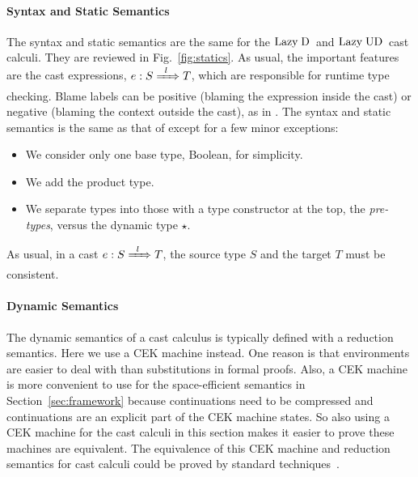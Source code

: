 \documentclass[runningheads]{llncs}
\newcommand{\figref}[1]{Fig.~\ref{#1}}
\newcommand{\chapref}[1]{Section~\ref{#1}}
\newcommand{\LUD}{\ensuremath{\text{Lazy\;UD}}}
\newcommand{\LD}{\ensuremath{\text{Lazy\;D}}}
\newcommand{\Tdyn}[0]{\ensuremath{\star}}
\newcommand{\ecast}[2]{\ensuremath{#1 : #2}}
\newcommand{\ccast}[3]{#1 \xRightarrow[]{\enskip #2 \enskip} #3}
\begin{document}
\paragraph{Syntax and Static Semantics}


The syntax and static semantics are the same for the \LD\ and
\LUD\ cast calculi. They are reviewed in \figref{fig:statics}.
As usual, the important features are the cast expressions,
$\ecast{e}{\ccast{S}{l}{T}}$, which are responsible for runtime type
checking. Blame labels can be positive (blaming the expression inside the cast)
or negative (blaming the context outside the cast), as in \cite{wadler2009well}.
The syntax and static semantics is the same as that of 
\citep{siek2009exploring} except for a few minor exceptions:

\begin{itemize}
\item We consider only one base type, Boolean, for simplicity.
\item We add the product type.
\item We separate types into those with a type constructor at the top,
  the \emph{pre-types}, versus the dynamic type \Tdyn.
\end{itemize}
As usual, in a cast $\ecast{e}{\ccast{S}{l}{T}}$, the source type $S$
and the target $T$ must be consistent.

\paragraph{Dynamic Semantics}

The dynamic semantics of a cast calculus is typically defined with a
reduction semantics. Here we use a CEK machine
\citep{felleisen1986control} instead. One reason is that environments
are easier to deal with than substitutions in formal proofs. Also, a
CEK machine is more convenient to use for the space-efficient
semantics in \chapref{sec:framework} because continuations need to be
compressed and continuations are an explicit part of the CEK machine
states.  So also using a CEK machine for the cast calculi in this
section makes it easier to prove these machines are equivalent.  The
equivalence of this CEK machine and reduction semantics for cast
calculi could be proved by standard
techniques~\citep{Felleisen:2009aa}.
\end{document}
